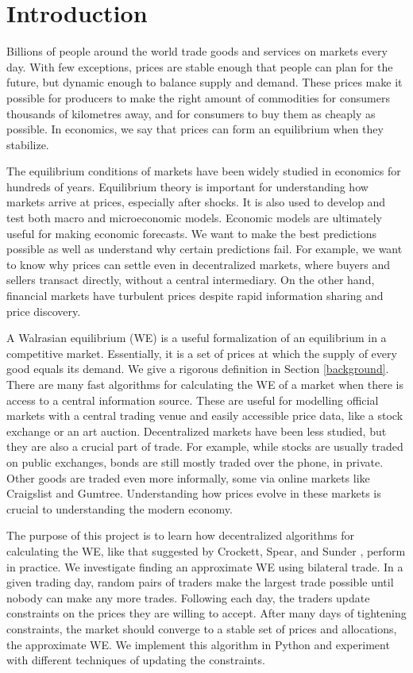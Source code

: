 \documentclass[12pt,a4paper,titlepage]{article}
\begin{document}
\tableofcontents
\newpage

\section{Introduction}
Billions of people around the world trade goods and services on markets every day.
With few exceptions, prices are stable enough that people can plan for the future, but dynamic enough to balance supply and demand.
These prices make it possible for producers to make the right amount of commodities for consumers thousands of kilometres away, and for consumers to buy them as cheaply as possible.
In economics, we say that prices can form an equilibrium when they stabilize.

The equilibrium conditions of markets have been widely studied in economics for hundreds of years.
Equilibrium theory is important for understanding how markets arrive at prices, especially after shocks. 
It is also used to develop and test both macro and microeconomic models. 
Economic models are ultimately useful for making economic forecasts.
We want to make the best predictions possible as well as understand why certain predictions fail.
For example, we want to know why prices can settle even in decentralized markets, where buyers and sellers transact directly, without a central intermediary.
On the other hand, financial markets have turbulent prices despite rapid information sharing and price discovery.

A Walrasian equilibrium (WE) is a useful formalization of an equilibrium in a competitive market.
Essentially, it is a set of prices at which the supply of every good equals its demand.
We give a rigorous definition in Section \ref{background}.
There are many fast algorithms for calculating the WE of a market when there is access to a central information source.
These are useful for modelling official markets with a central trading venue and easily accessible price data, like a stock exchange or an art auction.
Decentralized markets have been less studied, but they are also a crucial part of trade.
For example, while stocks are usually traded on public exchanges, bonds are still mostly traded over the phone, in private.
Other goods are traded even more informally, some via online markets like Craigslist and Gumtree.
Understanding how prices evolve in these markets is crucial to understanding the modern economy.

The purpose of this project is to learn how decentralized algorithms for calculating the WE, like that suggested by Crockett, Spear, and Sunder \cite{crockett}, perform in practice.
We investigate finding an approximate WE using bilateral trade.
In a given trading day, random pairs of traders make the largest trade possible until nobody can make any more trades. 
Following each day, the traders update constraints on the prices they are willing to accept.
After many days of tightening constraints, the market should converge to a stable set of prices and allocations, the approximate WE.
We implement this algorithm in Python and experiment with different techniques of updating the constraints.
\end{document}
